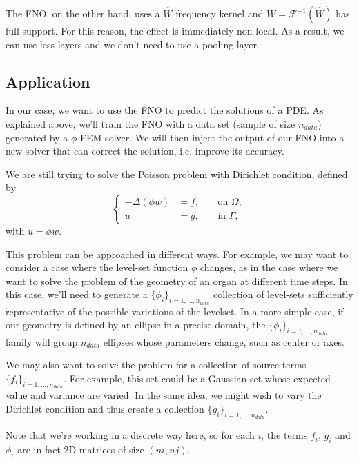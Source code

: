The FNO, on the other hand, uses a $\hat{W}$ frequency kernel and $W=\mathcal{F}^{-1}(\hat{W})$ has full support. For this reason, the effect is immediately non-local. As a result, we can use less layers and we don't need to use a pooling layer.

\subsection{Application} \label{FNO.application}

In our case, we want to use the FNO to predict the solutions of a PDE. As explained above, we'll train the FNO with a data set (sample of size $n_{data}$) generated by a $\phi$-FEM solver. We will then inject the output of our FNO into a new solver that can correct the solution, i.e. improve its accuracy. 

We are still trying to solve the Poisson problem with Dirichlet condition, defined by
\begin{equation*}
	\left\{\begin{aligned}
		-\Delta (\phi w)&=f, \; &&\text{on } \Omega, \\
		u&=g, \; &&\text{in } \Gamma,
	\end{aligned}\right.
\end{equation*}
with $u=\phi w$.

This problem can be approached in different ways.
For example, we may want to consider a case where the level-set function $\phi$ changes, as in the case where we want to solve the problem of the geometry of an organ at different time steps. In this case, we'll need to generate a $\{\phi_i\}_{i=1,\dots,n_{data}}$ collection of level-sets sufficiently representative of the possible variations of the levelset. In a more simple case, if our geometry is defined by an ellipse in a precise domain, the $\{\phi_i\}_{i=1,\dots,n_{data}}$ family will group $n_{data}$ ellipses whose parameters change, such as center or axes.

We may also want to solve the problem for a collection of source terms $\{f_i\}_{i=1,\dots,n_{data}}$. For example, this set could be a Gaussian set whose expected value and variance are varied. In the same idea, we might wish to vary the Dirichlet condition and thus create a collection $\{g_i\}_{i=1,\dots,n_{data}}$.

\begin{Rem}
	Note that we're working in a discrete way here, so for each $i$, the terms $f_i$, $g_i$ and $\phi_i$ are in fact 2D matrices of size $(ni,nj)$.
\end{Rem}

